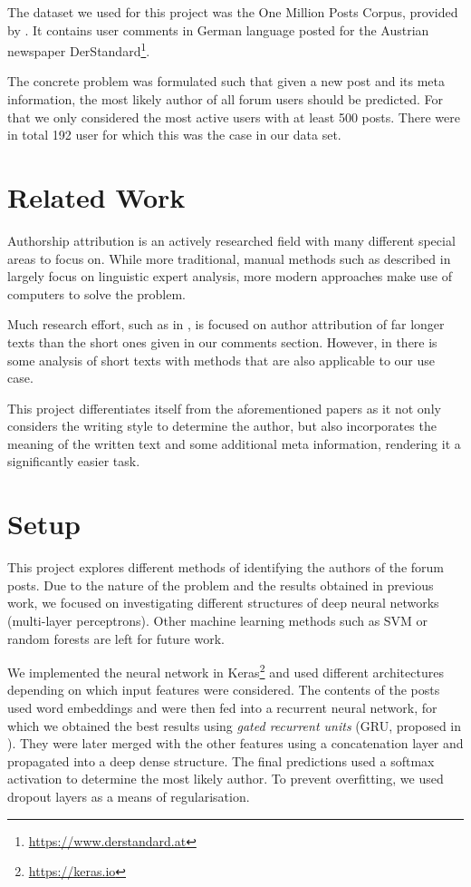 \documentclass[acmsmall]{acmart}
\begin{document}
The dataset we used for this project was the One Million Posts Corpus, provided by \cite{MillionPosts}. It contains user comments in German language posted for the Austrian newspaper DerStandard\footnote{\url{https://www.derstandard.at}}.

The concrete problem was formulated such that given a new post and its meta information, the most likely author of all forum users should be predicted. For that we only considered the most active users with at least 500 posts. There were in total 192 user for which this was the case in our data set.

\section{Related Work}

Authorship attribution is an actively researched field with many different special areas to focus on. While more traditional, manual methods such as described in \cite{criminalForensics} largely focus on linguistic expert analysis, more modern approaches make use of computers to solve the problem.

Much research effort, such as in \cite{rexha2015towards,sanderson2006short}, is focused on author attribution of far longer texts than the short ones given in our comments section. However, in \cite{smith2009authorship,macleod2012whose} there is some analysis of short texts with methods that are also applicable to our use case. 

This project differentiates itself from the aforementioned papers as it not only considers the writing style to determine the author, but also incorporates the meaning of the written text and some additional meta information, rendering it a significantly easier task.

\section{Setup}

This project explores different methods of identifying the authors of the forum posts. Due to the nature of the problem and the results obtained in previous work, we focused on investigating different structures of deep neural networks (multi-layer perceptrons). Other machine learning methods such as SVM or random forests are left for future work.

We implemented the neural network in Keras\footnote{\url{https://keras.io}} and used different architectures depending on which input features were considered. The contents of the posts used word embeddings and were then fed into a recurrent neural network, for which we obtained the best results using \textit{gated recurrent units} (GRU, proposed in \cite{gru}). They were later merged with the other features using a concatenation layer and propagated into a deep dense structure. The final predictions used a softmax activation to determine the most likely author. To prevent overfitting, we used dropout layers as a means of regularisation.
\end{document}
